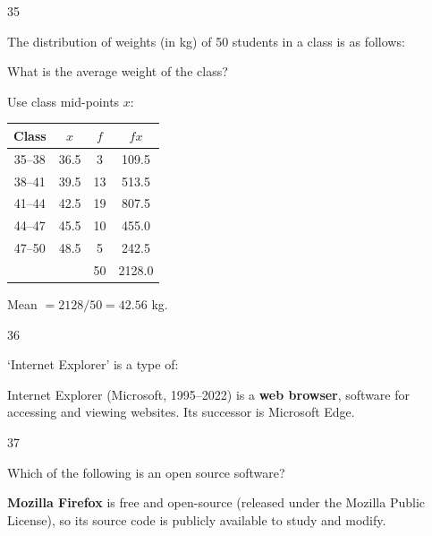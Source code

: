 \begin{question}{35}
{The distribution of weights (in kg) of 50 students in a class is as follows:\par}
What is the average weight of the class?
\begin{explain}
Use class mid-points $x$:
\begin{center}\small
\begin{tabular}{cccc}\toprule Class & $x$ & $f$ & $fx$\\\midrule
35--38 & 36.5 & 3 & 109.5\\ 38--41 & 39.5 & 13 & 513.5\\ 41--44 & 42.5 & 19 & 807.5\\ 44--47 & 45.5 & 10 & 455.0\\ 47--50 & 48.5 & 5 & 242.5\\\midrule
& & 50 & 2128.0\\\bottomrule\end{tabular}
\end{center}
Mean $=2128/50=\mathbf{42.56}$ kg.
\end{explain}
\end{question}

\begin{question}{36}
{`Internet Explorer' is a type of:\par}
\begin{explain}
Internet Explorer (Microsoft, 1995--2022) is a \textbf{web browser}, software for accessing and viewing websites. Its successor is Microsoft Edge.
\end{explain}
\end{question}

\begin{question}{37}
{Which of the following is an open source software?\par}
\begin{explain}
\textbf{Mozilla Firefox} is free and open-source (released under the Mozilla Public License), so its source code is publicly available to study and modify.
\end{explain}
\end{question}


